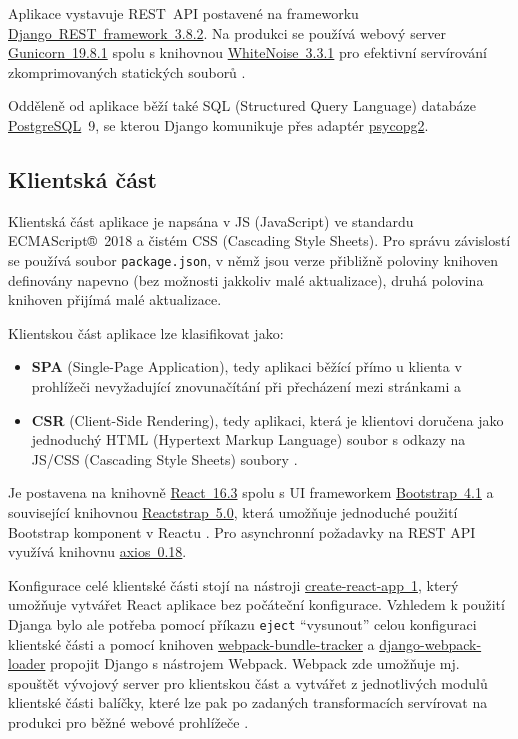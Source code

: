 Aplikace vystavuje REST~API postavené na frameworku \href{https://www.django-rest-framework.org/}{Django~REST~framework~3.8.2}. Na produkci se používá webový server \href{http://gunicorn.org/}{Gunicorn~19.8.1} spolu s knihovnou \href{http://whitenoise.evans.io/en/stable/}{WhiteNoise~3.3.1} pro efektivní servírování zkomprimovaných statických souborů \cite{whitenoise}.

Odděleně od aplikace běží také SQL (Structured Query Language) databáze \href{https://www.postgresql.org/}{PostgreSQL}~9, se kterou Django komunikuje přes adaptér \href{https://www.psycopg.org/}{psycopg2}.

\subsection{Klientská část}

Klientská část aplikace \cite{bp} je napsána v JS (JavaScript) ve standardu ECMAScript®~2018 a čistém CSS (Cascading Style Sheets). Pro správu závislostí se používá soubor \verb|package.json|, v němž jsou verze přibližně poloviny knihoven definovány napevno (bez možnosti jakkoliv malé aktualizace), druhá polovina knihoven přijímá malé aktualizace. 

Klientskou část aplikace lze klasifikovat jako: 
\begin{itemize}
    \item \textbf{SPA} (Single-Page Application), tedy aplikaci běžící přímo u klienta v prohlížeči nevyžadující znovunačítání při přecházení mezi stránkami \cite{spa1} a
    \item \textbf{CSR} (Client-Side Rendering), tedy aplikaci, která je klientovi doručena jako jednoduchý HTML (Hypertext Markup Language) soubor s odkazy na JS/CSS (Cascading Style Sheets) soubory \cite{csr-ssr}.
\end{itemize}

Je postavena na knihovně \href{https://reactjs.org/}{React~16.3} spolu s UI frameworkem \href{https://getbootstrap.com}{Bootstrap~4.1} a související knihovnou \href{https://reactstrap.github.io/}{Reactstrap~5.0}, která umožňuje jednoduché použití Bootstrap komponent v Reactu \cite{reactstrap}. Pro asynchronní požadavky na REST API využívá knihovnu \href{https://github.com/axios/axios}{axios~0.18}. 

Konfigurace celé klientské části stojí na nástroji \href{https://github.com/facebook/create-react-app}{create-react-app~1}, který umožňuje \cite{cra} vytvářet React aplikace bez počáteční konfigurace. Vzhledem k použití Djanga bylo ale potřeba \cite{bp} pomocí příkazu \verb|eject| \enquote{vysunout} celou konfiguraci klientské části a pomocí knihoven \href{https://github.com/owais/webpack-bundle-tracker}{webpack-bundle-tracker} a  \href{https://github.com/owais/django-webpack-loader}{django-webpack-loader} propojit Django s nástrojem Webpack. Webpack zde umožňuje mj. spouštět vývojový server pro klientskou část a vytvářet z jednotlivých modulů klientské části balíčky, které lze pak po zadaných transformacích servírovat na produkci pro běžné webové prohlížeče \cite{webpack-ackee}.

